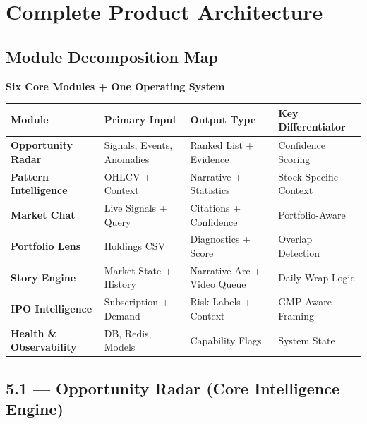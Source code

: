 \documentclass[11pt,a4paper]{article}
\begin{document}
\section{Complete Product Architecture}

\subsection{Module Decomposition Map}

\begin{tcolorbox}[colback=mn-light, colframe=mn-blue, arc=2mm, boxsep=10pt, width=\textwidth]
\centering
\textbf{\color{mn-navy}Six Core Modules + One Operating System}

\vspace{0.8cm}

{\small
\begin{tabular}{|p{1.2cm}|p{1.8cm}|p{1.8cm}|p{1.8cm}|}
\hline
\rowcolor{mn-blue!20}
\textbf{Module} & \textbf{Primary Input} & \textbf{Output Type} & \textbf{Key Differentiator} \\
\hline
\textbf{Opportunity Radar} & Signals, Events, Anomalies & Ranked List + Evidence & Confidence Scoring \\
\hline
\textbf{Pattern Intelligence} & OHLCV + Context & Narrative + Statistics & Stock-Specific Context \\
\hline
\textbf{Market Chat} & Live Signals + Query & Citations + Confidence & Portfolio-Aware \\
\hline
\textbf{Portfolio Lens} & Holdings CSV & Diagnostics + Score & Overlap Detection \\
\hline
\textbf{Story Engine} & Market State + History & Narrative Arc + Video Queue & Daily Wrap Logic \\
\hline
\textbf{IPO Intelligence} & Subscription + Demand & Risk Labels + Context & GMP-Aware Framing \\
\hline
\textbf{Health \& Observability} & DB, Redis, Models & Capability Flags & System State \\
\hline
\end{tabular}
}

\end{tcolorbox}

\vspace{1cm}

\subsection{5.1 — Opportunity Radar (Core Intelligence Engine)}
\end{document}
